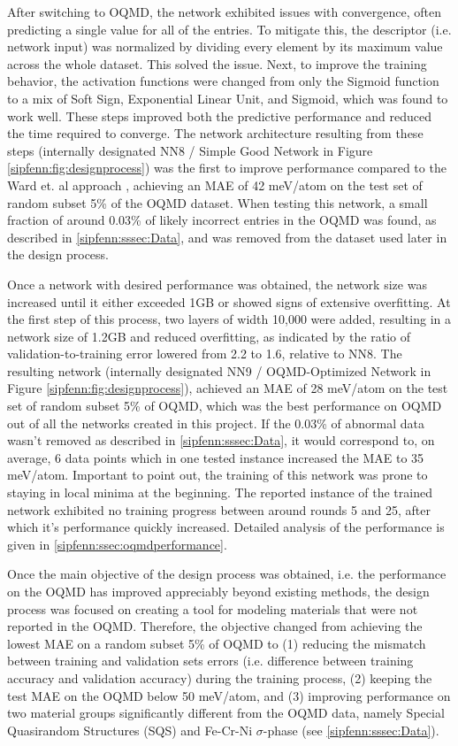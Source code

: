 After switching to OQMD, the network exhibited issues with convergence, often predicting a single value for all of the entries. To mitigate this, the descriptor (i.e. network input) was normalized by dividing every element by its maximum value across the whole dataset. This solved the issue. Next, to improve the training behavior, the activation functions were changed from only the Sigmoid function to a mix of Soft Sign, Exponential Linear Unit, and Sigmoid, which was found to work well. These steps improved both the predictive performance and reduced the time required to converge. The network architecture resulting from these steps (internally designated NN8 / Simple Good Network in Figure \ref{sipfenn:fig:designprocess}) was the first to improve performance compared to the Ward et. al approach \cite{Ward2017IncludingTessellations}, achieving an MAE of 42 meV/atom on the test set of random subset 5\% of the OQMD dataset. When testing this network, a small fraction of around 0.03\% of likely incorrect entries in the OQMD was found, as described in \ref{sipfenn:sssec:Data}, and was removed from the dataset used later in the design process.

Once a network with desired performance was obtained, the network size was increased until it either exceeded 1GB or showed signs of extensive overfitting. At the first step of this process, two layers of width 10,000 were added, resulting in a network size of 1.2GB and reduced overfitting, as indicated by the ratio of validation-to-training error lowered from 2.2 to 1.6, relative to NN8. The resulting network (internally designated NN9 / OQMD-Optimized Network in Figure \ref{sipfenn:fig:designprocess}), achieved an MAE of 28 meV/atom on the test set of random subset 5\% of OQMD, which was the best performance on OQMD out of all the networks created in this project. If the 0.03\% of abnormal data wasn't removed as described in \ref{sipfenn:sssec:Data}, it would correspond to, on average, 6 data points which in one tested instance increased the MAE to 35 meV/atom. Important to point out, the training of this network was prone to staying in local minima at the beginning. The reported instance of the trained network exhibited no training progress between around rounds 5 and 25, after which it's performance quickly increased.  Detailed analysis of the performance is given in \ref{sipfenn:ssec:oqmdperformance}.

Once the main objective of the design process was obtained, i.e. the performance on the OQMD has improved appreciably beyond existing methods, the design process was focused on creating a tool for modeling materials that were not reported in the OQMD. Therefore, the objective changed from achieving the lowest MAE on a random subset 5\% of OQMD to (1) reducing the mismatch between training and validation sets errors (i.e. difference between training accuracy and validation accuracy) during the training process, (2) keeping the test MAE on the OQMD below 50 meV/atom, and (3) improving performance on two material groups significantly different from the OQMD data, namely Special Quasirandom Structures (SQS) and Fe-Cr-Ni $\sigma$-phase (see \ref{sipfenn:sssec:Data}).

